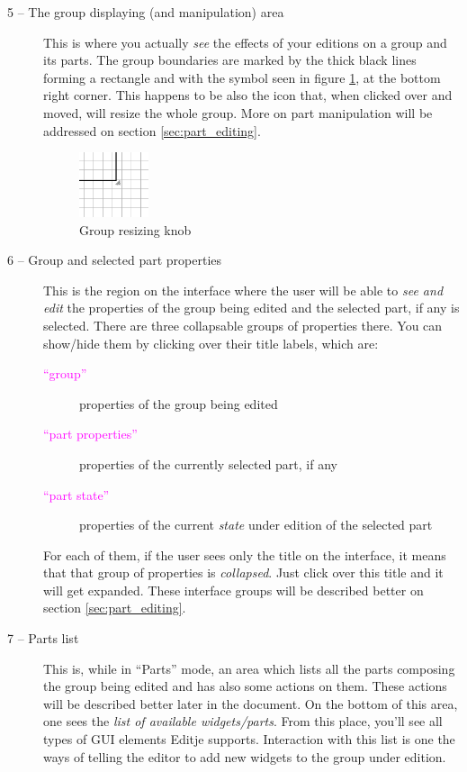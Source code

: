 \documentclass[a4paper]{profusion}
\newcommand{\GUILabel}[1]{\textcolor{magenta}{#1}}
\begin{document}
\begin{description}
\item[5 -- The group displaying (and manipulation) area] This is where
  you actually \emph{see} the effects of your editions on a group and
  its parts. The group boundaries are marked by the thick black lines
  forming a rectangle and with the symbol seen in figure
  \ref{fig:group_edje}, at the bottom right corner. This happens to be
  also the icon that, when clicked over and moved, will resize the
  whole group. More on part manipulation will be addressed on section
  \ref{sec:part_editing}.

\begin{figure}[h!]
  \centering
  \includegraphics[width=0.2\textwidth]{images/group_edje.png}
  \caption{Group resizing knob}
  \label{fig:group_edje}
\end{figure}

\item[6 -- Group and selected part properties] This is the region on
  the interface where the user will be able to \emph{see and edit} the
  properties of the group being edited and the selected part, if any
  is selected. There are three collapsable groups of properties
  there. You can show/hide them by clicking over their title labels,
  which are:

  \begin{description}
    \item[\GUILabel{``group''}] properties of the group being edited
    \item[\GUILabel{``part properties''}] properties of the currently
      selected part, if any
    \item[\GUILabel{``part state''}] properties of the current
      \emph{state} under edition of the selected part
  \end{description}

For each of them, if the user sees only the title on the interface, it
means that that group of properties is \emph{collapsed}. Just click
over this title and it will get expanded. These interface groups will
be described better on section \ref{sec:part_editing}.

\item[7 -- Parts list] This is, while in ``Parts'' mode, an area which
  lists all the parts composing the group being edited and has also
  some actions on them. These actions will be described better later
  in the document. On the bottom of this area, one sees the \emph{list
    of available widgets/parts}. From this place, you'll see all types
  of GUI elements Editje supports. Interaction with this list is one
  the ways of telling the editor to add new widgets to the group under
  edition.

\end{description}
\end{document}
